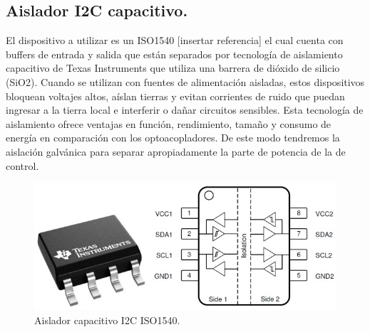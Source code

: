 \subsection{Aislador I2C capacitivo.}
El dispositivo a utilizar es un ISO1540 [insertar referencia] el cual cuenta con buffers de entrada y salida que están separados por tecnología de aislamiento capacitivo de Texas Instruments que utiliza una barrera de dióxido de silicio (SiO2). Cuando se utilizan con fuentes de alimentación aisladas, estos dispositivos bloquean voltajes altos, aíslan tierras y evitan corrientes de ruido que puedan ingresar a la tierra local e interferir o dañar circuitos sensibles. Esta tecnología de aislamiento ofrece ventajas en función, rendimiento, tamaño y consumo de energía en comparación con los optoacopladores.
De este modo tendremos la aislación galvánica para separar apropiadamente la parte de potencia de la de control.
\begin{figure}[H]
    \centering
    \includegraphics[scale=0.3]{./imagenes/optoi2c.jpg}
    \caption{Aislador capacitivo I2C ISO1540.}
    \label{F:optoi2c}
\end{figure}


